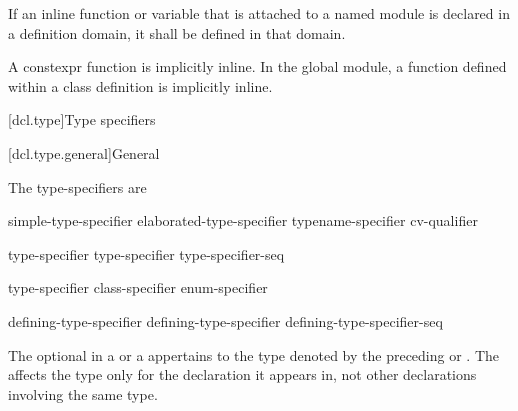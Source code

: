 \pnum
If an inline function or variable that is attached to a named module
is declared in a definition domain,
it shall be defined in that domain.
\begin{note}
A constexpr function is implicitly inline.
In the global module, a function defined within a class definition
is implicitly inline.
\end{note}

[dcl.type]{Type specifiers}%

[dcl.type.general]{General}%

\pnum
The type-specifiers are
%
%
%
\begin{bnf}
\br
  simple-type-specifier\br
  elaborated-type-specifier\br
  typename-specifier\br
  cv-qualifier
\end{bnf}

\begin{bnf}
\br
    type-specifier \br
    type-specifier type-specifier-seq
\end{bnf}

\begin{bnf}
\br
    type-specifier\br
    class-specifier\br
    enum-specifier
\end{bnf}

\begin{bnf}
\br
  defining-type-specifier \br
  defining-type-specifier defining-type-specifier-seq
\end{bnf}

The optional  in a 
or a 
appertains
to the type denoted by the preceding 
or . The
 affects the type only for the declaration it appears in,
not other declarations involving the same type.

